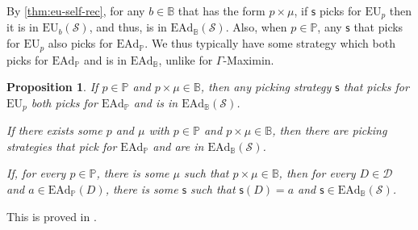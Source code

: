 \documentclass[a4paper,final]{article}
\newtheorem{proposition}[theorem]{Proposition}
\renewcommand\P{\mathbb{P}} %
\newcommand\EU{\mathrm{EU}}
\newcommand\EAd{\mathrm{EAd}}
\newcommand{\D}{\mathcal{D}}
\newcommand{\Decs}{\mathcal{D}}
\renewcommand\S{\mathcal{S}}
\newcommand\s{\mathsf{s}}
\newcommand{\IB}{\mathbb{B}}
\newcommand{\IP}{\P}
\renewcommand{\color}[1]{}
\newenvironment{colored}[1]{\leavevmode\color{#1}}{}
\newcommand{\Strategies}{\S}
\newenvironment{CCM rewritten}
{\begingroup\color{blue}} %
{\endgroup}              %
\begin{document}
By \cref{thm:eu-self-rec}, for any $b\in\IB$ that has the form $p\times\mu$, if $\s$ picks for $\EU_p$ then it is in $\EU_{b}(\S)$, and thus, is in $\EAd_\IB(\S)$. Also, when $p\in\IP$, any $\s$ that picks for $\EU_p$ also picks for $\EAd_\IP$. We thus typically have some strategy which both picks for $\EAd_\IP$ and is in $\EAd_\IB$, unlike for $\Gamma$-Maximin. 
 \begin{proposition}\label{thm:ead-existence[indep]}
	If $p\in\IP$ and $p\times\mu\in\IB$, then any picking strategy $\s$ that picks for $\EU_p$ both picks for $\EAd_\IP$ and is in $\EAd_\IB(\S)$. 
	
	If there exists some $p$ and $\mu$ with $p\in\IP$ and $p\times\mu\in\IB$, then there are picking strategies that pick for $\EAd_\IP$ and are in $\EAd_\IB(\S)$. 
	
	If, for every $p\in\IP$, there is some $\mu$ such that $p\times\mu\in\IB$, then for every $D\in\Decs$ and $a\in\EAd_\IP(D)$, there is some $\s$ such that $\s(D)=a$ and $\s\in\EAd_\IB(\S)$. 
\end{proposition}

This is proved in .

	

 		
 
\end{document}
